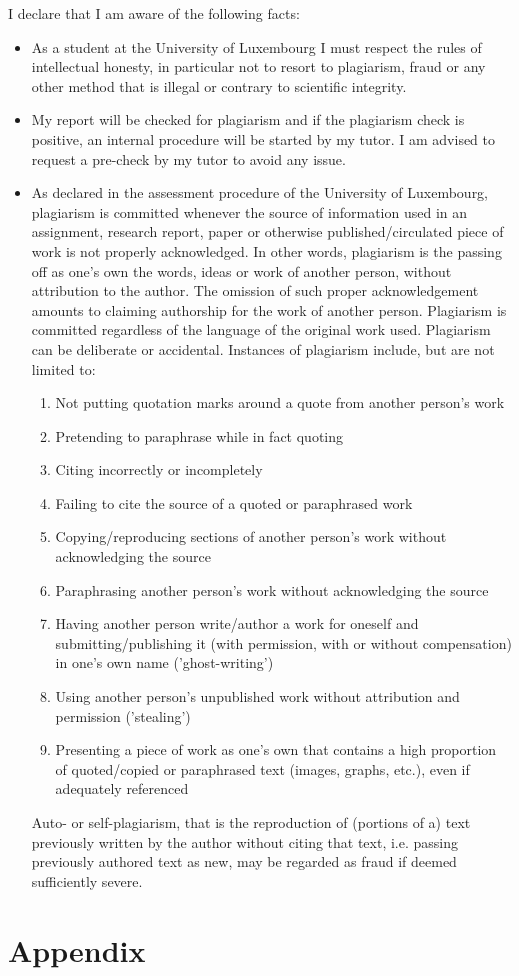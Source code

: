 \documentclass[conference,compsoc]{IEEEtran}
\begin{document}
I declare that I am aware of the following facts:
\begin{itemize}
  \item As a student at the University of Luxembourg I must respect the rules of intellectual honesty, in particular not to resort to plagiarism, fraud or any other method that is illegal or contrary to scientific integrity.
  \item My report will be checked for plagiarism and if the plagiarism check is positive, an internal procedure will be started by my tutor. I am advised to request a pre-check by my tutor to avoid any issue.
  \item As declared in the assessment procedure of the University of Luxembourg, plagiarism is committed whenever the source of information used in an assignment, research report, paper or otherwise published/circulated piece of work is not properly acknowledged. In other words, plagiarism is the passing off as one's own the words, ideas or work of another person, without attribution to the author. The omission of such proper acknowledgement amounts to claiming authorship for the work of another person. Plagiarism is committed regardless of the language of the original work used. Plagiarism can be deliberate or accidental.
        Instances of plagiarism include, but are not limited to:
        \begin{enumerate}
          \item Not putting quotation marks around a quote from another person's work
          \item Pretending to paraphrase while in fact quoting
          \item Citing incorrectly or incompletely
          \item Failing to cite the source of a quoted or paraphrased work
          \item Copying/reproducing sections of another person's work without acknowledging the source
          \item Paraphrasing another person's work without acknowledging the source
          \item Having another person write/author a work for oneself and submitting/publishing it (with permission, with or without compensation) in one's own name ('ghost-writing')
          \item Using another person's unpublished work without attribution and permission ('stealing')
          \item Presenting a piece of work as one's own that contains a high proportion of quoted/copied or paraphrased text (images, graphs, etc.), even if adequately referenced
        \end{enumerate}
        Auto- or self-plagiarism, that is the reproduction of (portions of a) text previously written by the author without citing that text, i.e. passing previously authored text as new, may be regarded as fraud if deemed sufficiently severe.
\end{itemize}



\newpage
\nocite{bics-bsp-report-template}




\newpage
\section{Appendix}
\end{document}
